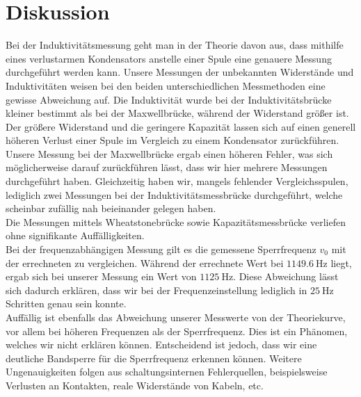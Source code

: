 \section{Diskussion}
\label{sec:Diskussion}
Bei der Induktivitätsmessung geht man in der Theorie davon aus, dass mithilfe eines verlustarmen Kondensators anstelle einer Spule eine genauere Messung durchgeführt werden kann.
Unsere Messungen der unbekannten Widerstände und Induktivitäten weisen bei den beiden unterschiedlichen Messmethoden eine gewisse Abweichung auf.
Die Induktivität wurde bei der Induktivitätsbrücke kleiner bestimmt als bei der Maxwellbrücke, während der Widerstand größer ist.
Der größere Widerstand und die geringere Kapazität lassen sich auf einen generell höheren Verlust einer Spule im Vergleich zu einem Kondensator zurückführen. \\
Unsere Messung bei der Maxwellbrücke ergab einen höheren Fehler, was sich möglicherweise darauf zurückführen lässt, dass wir hier mehrere Messungen durchgeführt haben.
Gleichzeitig haben wir, mangels fehlender Vergleichsspulen, lediglich zwei Messungen bei der Induktivitätsmessbrücke durchgeführt, welche scheinbar zufällig nah beieinander gelegen haben.\\
Die Messungen mittels Wheatstonebrücke sowie Kapazitätsmessbrücke verliefen ohne signifikante Auffälligkeiten. \\
Bei der frequenzabhängigen Messung gilt es die gemessene Sperrfrequenz $v_0$ mit der errechneten zu vergleichen.
Während der errechnete Wert bei $\SI{1149.6}{\hertz}$ liegt, ergab sich bei unserer Messung ein Wert von $\SI{1125}{\hertz}$.
Diese Abweichung lässt sich dadurch erklären, dass wir bei der Frequenzeinstellung lediglich in $\SI{25}{\hertz}$ Schritten genau sein konnte.\\
Auffällig ist ebenfalls das Abweichung unserer Messwerte von der Theoriekurve, vor allem bei höheren Frequenzen als der Sperrfrequenz.
Dies ist ein Phänomen, welches wir nicht erklären können.
Entscheidend ist jedoch, dass wir eine deutliche Bandsperre für die Sperrfrequenz erkennen können.
Weitere Ungenauigkeiten folgen aus schaltungsinternen Fehlerquellen, beispielsweise Verlusten an Kontakten, reale Widerstände von Kabeln, etc.
